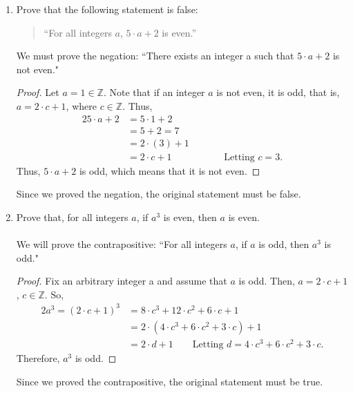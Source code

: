 \documentclass{article}
\begin{document}
\begin{enumerate}
	\item Prove that the following statement is false:
        \begin{quotation}
            ``For all integers $a$, $5 \cdot a + 2$ is even.''
        \end{quotation}
            We must prove the negation: ``There exists an integer a such that $5 \cdot a + 2$ is not even."
            \begin{proof}
                Let $a = 1\in \mathbb{Z}$. Note that if an integer $a$ is not even, it is odd, that is, $a = 2 \cdot c + 1$, where $c \in \mathbb{Z}$. Thus,
                \begin{alignat*}{2}
                    5 \cdot a + 2 &= 5 \cdot 1 + 2 \\
                    &= 5 + 2 = 7 \\
                    &= 2 \cdot (3) + 1 \\
                    &= 2\cdot c + 1 &\qquad &\textrm{Letting $c = 3$.}  
                \end{alignat*}
                Thus, $5 \cdot a + 2$ is odd, which means that it is not even. 
            \end{proof}
            Since we proved the negation, the original statement must be false.
        
	\item Prove that, for all integers $a$, if $a^3$ is even, then $a$ is even. \\\\
            We will prove the contrapositive: ``For all integers $a$, if $a$ is odd, then $a^3$ is odd."
            \begin{proof}
                Fix an arbitrary integer a and assume that $a$ is odd. Then, $a = 2 \cdot c + 1$, $c\in \mathbb{Z}$. So,
                \begin{alignat*}{2}
                    a^3 = (2\cdot c + 1)^3 &= 8\cdot c^3 + 12 \cdot c^2 + 6\cdot c + 1 \\
                    &= 2\cdot(4\cdot c^3 + 6 \cdot c^2 + 3\cdot c) + 1 \\
                    &= 2 \cdot d + 1 \qquad \textrm{Letting $d = 4\cdot c^3 + 6 \cdot c^2 + 3\cdot c$.}
                \end{alignat*}
                Therefore, $a^3$ is odd.
            \end{proof}
            Since we proved the contrapositive, the original statement must be true.


\end{enumerate}
\end{document}
